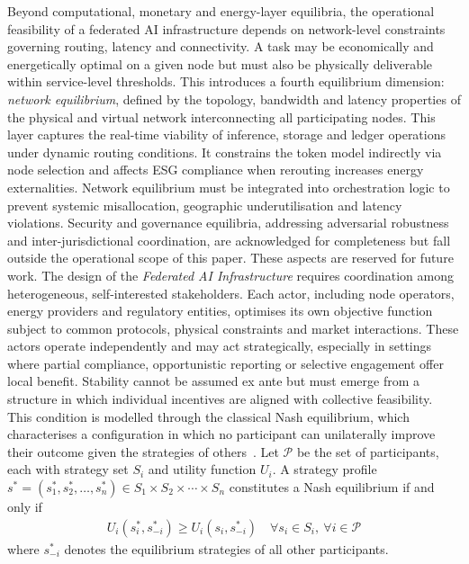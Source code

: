 \documentclass[oneside,10pt]{swissi}
\begin{document}
Beyond computational, monetary and energy-layer equilibria, the operational feasibility of a federated AI infrastructure depends on network-level constraints governing routing, latency and connectivity. A task may be economically and energetically optimal on a given node but must also be physically deliverable within service-level thresholds. This introduces a fourth equilibrium dimension: \textit{network equilibrium}, defined by the topology, bandwidth and latency properties of the physical and virtual network interconnecting all participating nodes. This layer captures the real-time viability of inference, storage and ledger operations under dynamic routing conditions. It constrains the token model indirectly via node selection and affects ESG compliance when rerouting increases energy externalities. Network equilibrium must be integrated into orchestration logic to prevent systemic misallocation, geographic underutilisation and latency violations. Security and governance equilibria, addressing adversarial robustness and inter-jurisdictional coordination, are acknowledged for completeness but fall outside the operational scope of this paper. These aspects are reserved for future work. The design of the \textit{Federated AI Infrastructure} requires coordination among heterogeneous, self-interested stakeholders. Each actor, including node operators, energy providers and regulatory entities, optimises its own objective function subject to common protocols, physical constraints and market interactions. These actors operate independently and may act strategically, especially in settings where partial compliance, opportunistic reporting or selective engagement offer local benefit. Stability cannot be assumed ex ante but must emerge from a structure in which individual incentives are aligned with collective feasibility. This condition is modelled through the classical Nash equilibrium, which characterises a configuration in which no participant can unilaterally improve their outcome given the strategies of others~\cite{osborne2004course}. Let \( \mathcal{P} \) be the set of participants, each with strategy set \( S_i \) and utility function \( U_i \). A strategy profile \( s^* = (s_1^*, s_2^*, \ldots, s_n^*) \in S_1 \times S_2 \times \cdots \times S_n \) constitutes a Nash equilibrium if and only if
\begin{align}
U_i(s_i^*, s_{-i}^*) \geq U_i(s_i, s_{-i}^*) \quad \forall s_i \in S_i,\ \forall i \in \mathcal{P}
\end{align}
where \( s_{-i}^* \) denotes the equilibrium strategies of all other participants.
\end{document}
